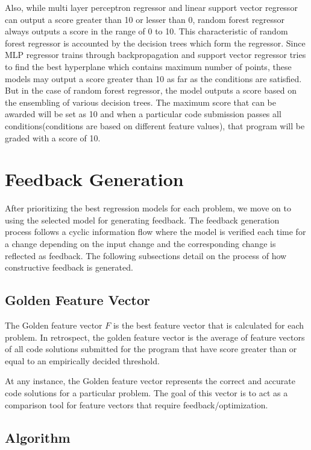 \documentclass[conference]{IEEEtran}
\begin{document}
Also, while multi layer perceptron regressor and linear support vector regressor can output a score greater than 10 or lesser than 0, random forest regressor always outputs a score in the range of 0 to 10. This characteristic of random forest regressor is accounted by the decision trees which form the regressor. Since MLP regressor trains through backpropagation and support vector regressor tries to find the best hyperplane which contains maximum number of points, these models may output a score greater than 10 as far as the conditions are satisfied. But in the case of random forest regressor, the model outputs a score based on the ensembling of various decision trees. The maximum score that can be awarded will be set as 10 and when a particular code submission passes all conditions(conditions are based on different feature values), that program will be graded with a score of 10. 

\section{Feedback Generation}

After prioritizing the best regression models for each problem, we move on to using the selected model for generating feedback. The feedback generation process follows a cyclic information flow where the model is verified each time for a change depending on the input change and the corresponding change is reflected as feedback. The following subsections detail on the process of how constructive feedback is generated. 

\subsection{Golden Feature Vector}

    The Golden feature vector $F$ is the best feature vector that is calculated for each problem. In retrospect, the golden feature vector is the average of feature vectors of all code solutions submitted for the program that have score greater than or equal to an empirically decided threshold. 

At any instance, the Golden feature vector represents the correct and accurate code solutions for a particular problem. The goal of this vector is to act as a comparison tool for feature vectors that require feedback/optimization. 

\subsection{Algorithm}
\end{document}
